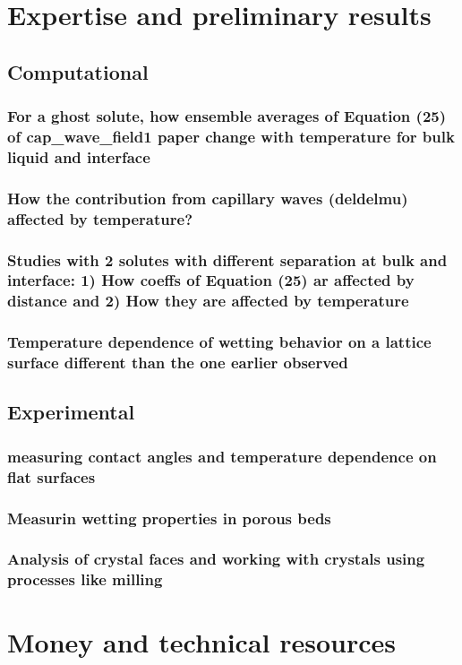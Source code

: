 \documentclass[a4paper,12pt,single,pdftex]{scrartcl}
\begin{document}
\label{ID_3125732}\section{Expertise and preliminary results}

\label{ID_1455861183}\subsection{Computational}

\label{ID_485443609}\subsubsection{For a ghost solute, how ensemble averages of Equation (25) of cap_wave_field1 paper change with temperature for bulk liquid and interface}

\label{ID_577294012}\subsubsection{How the contribution from capillary waves (deldelmu) affected by temperature?}

\label{ID_1474088810}\subsubsection{Studies with 2 solutes with different separation at bulk and interface: 1) How coeffs of Equation (25) ar affected by distance and 2) How they are affected by temperature}

\label{ID_1367637509}\subsubsection{Temperature dependence of wetting behavior on a lattice surface different than the one earlier observed}

\label{ID_1178677590}\subsection{Experimental}

\label{ID_1995511474}\subsubsection{measuring contact angles and temperature dependence on flat surfaces}

\label{ID_853592622}\subsubsection{Measurin wetting properties in porous beds}

\label{ID_1635488399}\subsubsection{Analysis of crystal faces and working with crystals using processes like milling}

\label{ID_1082352398}\section{Money and technical resources}


\newpage
\end{document}
